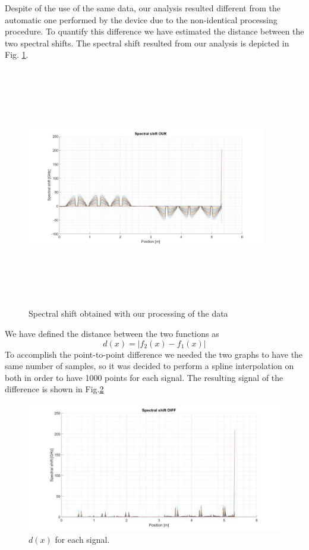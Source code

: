 Despite of the use of the same data, our analysis resulted different from the automatic one performed by the device due to the non-identical processing procedure. To quantify this difference we have estimated the distance between the two spectral shifts. The spectral shift resulted from our analysis is depicted in Fig. \ref{fig:spectralshift}.
\begin{figure}[H]
	\centering
	\includegraphics[height=10.5cm, width=10.5cm, keepaspectratio]{img/spectralshift.jpg}
	\caption{Spectral shift obtained with our processing of the data }\label{fig:spectralshift}
\end{figure}
We have defined the distance between the two functions as $$d(x) = |f_2(x) - f_1(x)|$$
To accomplish the point-to-point difference we needed the two graphs to have the same number of samples, so it was decided to perform a spline interpolation on both in order to have 1000 points for each signal. The resulting signal of the difference is shown in Fig.\ref{fig:difference}
\begin{figure}[H]
	\centering
	\includegraphics[scale=0.3]{img/diffok.jpg}
	\caption{$d(x)$ for each signal.}\label{fig:difference}
\end{figure}

